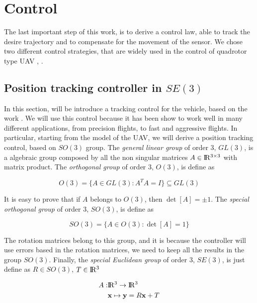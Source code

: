 \chapter{Control}
\label{control}

The last important step of this work, is to derive a control law, able to track the desire trajectory and to compensate for the movement of the sensor. We chose two different control strategies, that are widely used in the control of quadrotor type UAV \cite{LeeController}, \cite{MPCGeorge}.

\section{Position tracking controller in \texorpdfstring{$SE(3)$}{TEXT}}

In this section, will be introduce a tracking control for the vehicle, based on the work \cite{LeeController}. We will use this control because it has been show to work well in many different applications, from precision flights, to fast and aggressive flights. In particular, starting from the model of the UAV, we will derive a position tracking control, based on $SO(3)$ group. The \textit{general linear group} of order $3$, $GL(3)$, is a algebraic group composed by all the non singular matrices $A \in \rm I\!R^{3\times 3}$ with matrix product. The \textit{orthogonal group} of order $3$, $O(3)$, is define as

\begin{equation*}
	O(3) = \{A \in GL(3) : A^TA=I \} \subseteq GL(3)
\end{equation*}

\noindent It is easy to prove that if $A$ belongs to $O(3)$, then $\det[A]=\pm 1$. The \textit{special orthogonal group} of order $3$, $SO(3)$, is define as

\begin{equation*}
	SO(3) = \{A \in O(3) : \det[A] = 1\} 
\end{equation*}

\noindent The rotation matrices belong to this group, and it is because the controller will use errors based in the rotation matrices, we need to keep all the results in the group $SO(3)$. Finally, the \textit{special Euclidean group} of order $3$, $SE(3)$, is just define as $R \in SO(3)$, $T \in \rm I\!R^{3}$

\begin{align*}
	A : &\rm I\!R^{3} \to \rm I\!R^{3} \\
	    & \mathbf{x} \mapsto \mathbf{y}=R\mathbf{x} + T	
\end{align*}

